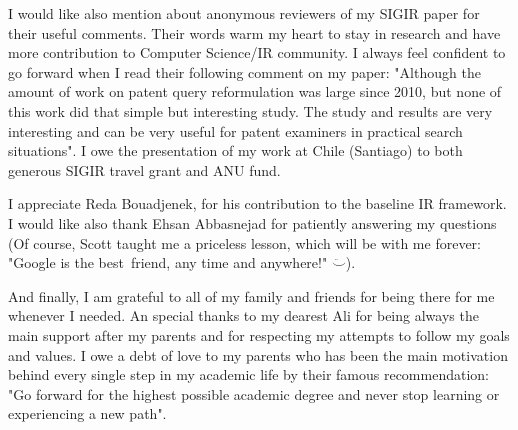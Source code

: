 I would like also mention about anonymous reviewers of my SIGIR paper  for their useful comments. Their words warm my heart to stay in research and have more contribution to Computer Science/IR community. I always feel confident to go forward when I read their following comment on my paper: "Although the amount of work on patent query reformulation was large since 2010, but none of this work did that simple but interesting study. The study and results are very interesting and can be very useful for patent examiners in practical search situations". I owe the presentation of my work at Chile (Santiago) to both generous SIGIR travel grant and ANU fund. 

I appreciate Reda Bouadjenek, for his contribution to the baseline IR framework. I would like also thank Ehsan Abbasnejad for patiently answering my questions (Of course, Scott taught me a priceless lesson, which will be with me forever: "Google is the best~friend, any time and anywhere!" $\ddot\smile$).

And finally, I am grateful to all of my family and friends for being there for me whenever I needed. An special thanks to my dearest Ali for being always the main support after my parents and for respecting my attempts to follow my goals and values. I owe a debt of love to my parents who has been the main motivation behind every single step in my academic life by their famous recommendation: "Go forward for the highest possible academic degree and never stop learning or experiencing a new path". 